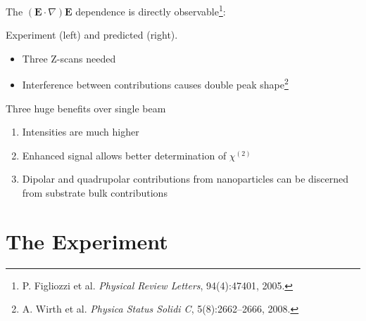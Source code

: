 \documentclass{beamer}
\begin{document}
\begin{frame}
\begin{center}
The $\left(\mathbf{E}\cdot\nabla\right)\mathbf{E}$ dependence is directly observable\footnote{P. Figliozzi et al. \emph{Physical Review Letters}, 94(4):47401, 2005.}:
\end{center}
\begin{figure}
\centering
\end{figure}
\begin{center}
Experiment (left) and predicted (right).
\end{center}
\end{frame}

\begin{frame}
\begin{itemize}
\item Three Z-scans needed
\item Interference between contributions causes double peak shape\footnote{A. Wirth et al. \emph{Physica Status Solidi C}, 5(8):2662--2666, 2008.}
\end{itemize}
\begin{figure}
\centering
\end{figure}
\end{frame}

\begin{frame}
\begin{block}{Three huge benefits over single beam}
\begin{enumerate}
\item Intensities are much higher
\item Enhanced signal allows better determination of $\chi^{(2)}$
\item Dipolar and quadrupolar contributions from nanoparticles can be discerned from substrate bulk contributions
\end{enumerate}
\end{block}
\end{frame}


\section{The Experiment}
\end{document}
